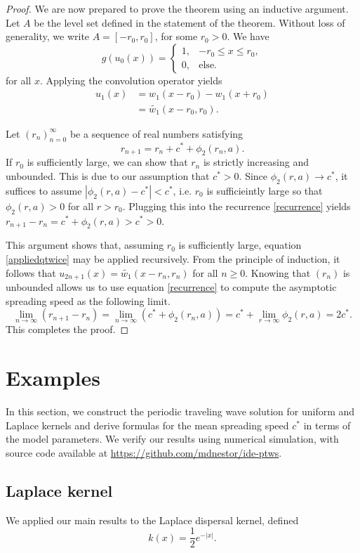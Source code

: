 \documentclass[11pt]{article}
\theoremstyle{definition}
\numberwithin{equation}{section}
\numberwithin{thm}{section}
\newcommand{\wone}{w_1}
\newcommand{\what}{\tilde{\wone}}
\begin{document}
\begin{proof}
We are now prepared to prove the theorem using an inductive argument.
Let $A$ be the level set defined in the statement of the theorem.
Without loss of generality, we write $A=[-r_0,r_0]$, for some $r_0>0$.
We have
$$
g(u_0(x)) = \begin{cases}
1, & -r_0 \leq x \leq r_0, \\
0, & \text{else}.
\end{cases}
$$
for all $x$. Applying the convolution operator yields
$$ \begin{aligned}
u_1(x) &= w_1(x-r_0) - w_1(x+r_0) \\
&= \what(x-r_0,r_0).
\end{aligned}
$$

Let $(r_n)_{n=0}^{\infty}$ be a sequence of real numbers satisfying
\begin{equation} \label{recurrence}
r_{n+1} = r_n + c^* + \phi_2(r_n,a).
\end{equation}
If $r_0$ is sufficiently large, we can show that $r_n$ is strictly increasing and unbounded.
This is due to our assumption that $c^*>0$.
Since $\phi_2(r,a)\to c^*$, it suffices to assume $|\phi_2(r,a)-c^*|<c^*$, i.e. $r_0$ is sufficieintly large so that $\phi_2(r,a)>0$ for all $r>r_0$.
Plugging this into the recurrence \eqref{recurrence} yields $r_{n+1}-r_n = c^* + \phi_2(r,a) > c^* > 0$.

This argument shows that, assuming $r_0$ is sufficiently large, equation \eqref{appliedqtwice} may be applied recursively.
From the principle of induction, it follows that $u_{2n+1}(x) = \what(x-r_n,r_n)$ for all $n \geq 0$.
Knowing that $(r_n)$ is unbounded allows us to use equation \eqref{recurrence} to compute the asymptotic spreading speed as the following limit.
$$
\lim_{n\to\infty} (r_{n+1}-r_n) = \lim_{n\to\infty} (c^* + \phi_2(r_n,a)) = c^* + \lim_{r\to\infty} \phi_2(r,a) = 2c^*.
$$
This completes the proof.
\end{proof}

\section{Examples}
In this section, we construct the periodic traveling wave solution for uniform and Laplace kernels and derive formulas for the mean spreading speed $c^*$ in terms of the model parameters. We verify our results using numerical simulation, with source code available at \url{https://github.com/mdnestor/ide-ptws}.

\subsection{Laplace kernel} 
We applied our main results to the Laplace dispersal kernel, defined
\begin{equation} \label{laplacekernel}
k(x) = \frac{1}{2} e^{-|x|}.
\end{equation}
\end{document}
